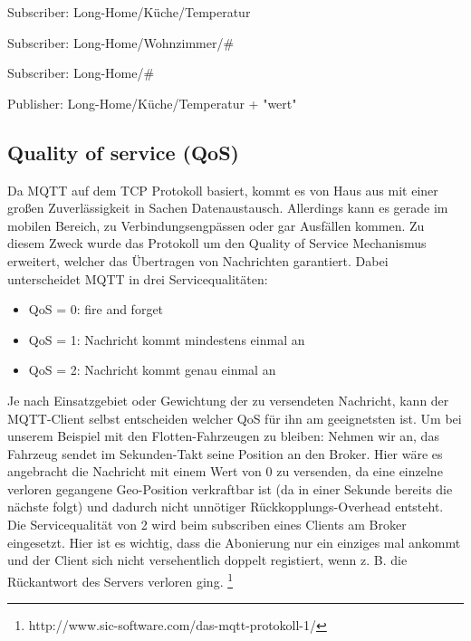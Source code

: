 \begin{tcolorbox}[colback=green!5,colframe=green!40!black,title=Nur die Temperatur aus Longs Küche]
Subscriber: Long-Home/Küche/Temperatur
\end{tcolorbox}

\begin{tcolorbox}[colback=green!5,colframe=green!40!black,title=Alles aus Longs Wohnzimmer]
Subscriber: Long-Home/Wohnzimmer/\#
\end{tcolorbox}

\begin{tcolorbox}[colback=green!5,colframe=green!40!black,title=Alles aus Long-Home]
Subscriber: Long-Home/\#
\end{tcolorbox}

\begin{tcolorbox}[colback=green!5,colframe=green!40!black,title=Temperatursensor wert publishen]
Publisher: Long-Home/Küche/Temperatur + "wert"
\end{tcolorbox}


\pagebreak
\subsection{Quality of service (QoS)}
Da MQTT auf dem TCP Protokoll basiert, kommt es von Haus aus mit einer großen Zuverlässigkeit in Sachen Datenaustausch. Allerdings kann es gerade im mobilen Bereich, zu Verbindungsengpässen oder gar Ausfällen kommen. Zu diesem Zweck wurde das Protokoll um den Quality of Service Mechanismus erweitert, welcher das Übertragen von Nachrichten garantiert. Dabei unterscheidet MQTT in drei Servicequalitäten:
\begin{itemize}
\item QoS = 0: fire and forget
\item QoS = 1: Nachricht kommt mindestens einmal an
\item QoS = 2: Nachricht kommt genau einmal an
\end{itemize}

Je nach Einsatzgebiet oder Gewichtung der zu versendeten Nachricht, kann der MQTT-Client selbst entscheiden welcher QoS für ihn am geeignetsten ist. Um bei unserem Beispiel mit den Flotten-Fahrzeugen zu bleiben: Nehmen wir an, das Fahrzeug sendet im Sekunden-Takt seine Position an den Broker. Hier wäre es angebracht die Nachricht mit einem Wert von 0 zu versenden, da eine einzelne verloren gegangene Geo-Position verkraftbar ist (da in einer Sekunde bereits die nächste folgt) und dadurch nicht unnötiger Rückkopplungs-Overhead entsteht. Die Servicequalität von 2 wird beim subscriben eines Clients am Broker eingesetzt. Hier ist es wichtig, dass die Abonierung nur ein einziges mal ankommt und der Client sich nicht versehentlich doppelt registiert, wenn z. B. die Rückantwort des Servers verloren ging.
\footnote{http://www.sic-software.com/das-mqtt-protokoll-1/}

